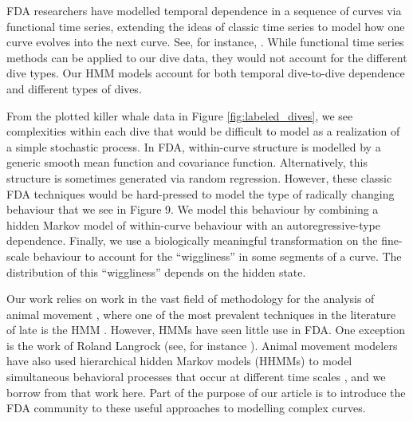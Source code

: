 FDA researchers have modelled temporal dependence in a sequence of curves  via functional time series, extending the ideas of classic time series to model how one curve evolves into the next curve.  See, for instance, \cite{Kokoszka:2018}. 
While  functional time series methods can be applied to our dive data, they would not account for the different dive types.
Our HMM models account for both temporal dive-to-dive dependence and different types of dives.


 

From the plotted killer whale data in Figure {\ref{fig:labeled_dives}}, we see complexities within each dive that would be difficult to model as a realization of a simple stochastic process. 
In FDA, within-curve structure is modelled by a generic smooth mean function and covariance function.
Alternatively, this structure is sometimes generated via random regression.
However, these classic FDA techniques would be hard-pressed to model the type of radically changing behaviour that we see in Figure 9.
We model this behaviour by combining a hidden Markov model of within-curve behaviour with an autoregressive-type dependence. Finally, we use a biologically meaningful transformation on the fine-scale behaviour to account for the ``wiggliness'' in some segments of a curve. The distribution of this ``wiggliness'' depends on the hidden state. %

Our work relies on work in the vast field of methodology for the analysis of animal movement
\citep{Hooten:2017,Mcclintock:2020}, where
one of the most prevalent techniques in the literature of late is the HMM \citep{Patterson:2017}. 
However, HMMs have seen little use in FDA.  
One exception is the work of Roland Langrock (see, for instance \citealt{Langrock:2018}).
Animal movement modelers have also used  hierarchical hidden Markov models (HHMMs) to model  simultaneous behavioral processes that occur at different time scales \citep{Barajas:2017,Adam:2019}, and we borrow from that work here. 
Part of the purpose of our article is to introduce the FDA community to these useful approaches to modelling complex curves. 

